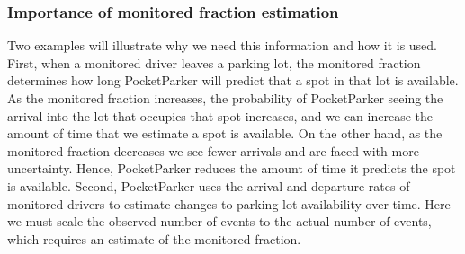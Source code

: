 \subsubsection{Importance of monitored fraction estimation}

Two examples will illustrate why we need this information and how it is used.
First, when a monitored driver leaves a parking lot, the monitored fraction
determines how long PocketParker will predict that a spot in that lot is
available. As the monitored fraction increases, the probability of
PocketParker seeing the arrival into the lot that occupies that spot
increases, and we can increase the amount of time that we estimate a spot is
available. On the other hand, as the monitored fraction decreases we see
fewer arrivals and are faced with more uncertainty. Hence, PocketParker
reduces the amount of time it predicts the spot is available. Second,
PocketParker uses the arrival and departure rates of monitored drivers to
estimate changes to parking lot availability over time. Here we must scale
the observed number of events to the actual number of events, which requires
an estimate of the monitored fraction.


